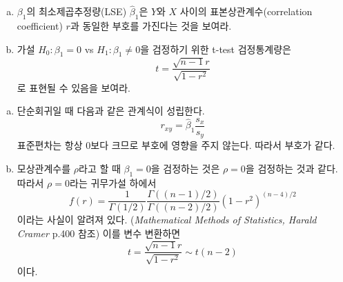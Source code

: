 \documentclass[answers]{exam}
\begin{document}
\begin{questions}
\begin{enumerate}[(a)]
    \item $\beta_{1}$의 최소제곱추정량(LSE) $\widehat{\beta}_{1}$은 $Y$와 $X$ 사이의 표본상관계수(correlation coefficient) $r$과 동일한 부호를 가진다는 것을 보여라.
    \item 가설 $H_{0}:\beta_{1}=0$ vs $H_{1}:\beta_{1}\neq 0$을 검정하기 위한 t-test 검정통계량은
    $$
      t=\dfrac{\sqrt{n-1}r}{\sqrt{1-r^{2}}}
    $$ 
    로 표현될 수 있음을 보여라.
   \end{enumerate}
   \begin{solution}
    \begin{enumerate}[(a)]
      \item 단순회귀일 때 다음과 같은 관계식이 성립한다.
      \begin{equation}
        r_{xy}=\widehat{\beta}_{1}\dfrac{s_{x}}{s_{y}}
      \end{equation}
      표준편차는 항상 0보다 크므로 부호에 영향을 주지 않는다. 따라서 부호가 같다.
      \item 모상관계수를 $\rho$라고 할 때 $\beta_{1}=0$을 검정하는 것은 $\rho=0$을 검정하는 것과 같다. 따라서 $\rho=0$라는 귀무가설 하에서
      \begin{equation}
        f\left(r\right) = \dfrac{1}{\Gamma\left(1/2\right)}\dfrac{\Gamma\left(\left(n-1\right)/2\right)}{\Gamma\left(\left(n-2\right)/2\right)}\left(1-r^{2}\right)^{\left(n-4\right)/2}
      \end{equation}
      이라는 사실이 알려져 있다. (\emph{Mathematical Methods of Statistics, Harald Cramer} p.400 참조) 이를 변수 변환하면
      \begin{equation}
        t=\dfrac{\sqrt{n-1}r}{\sqrt{1-r^{2}}}\sim t\left(n-2\right)
      \end{equation}
      이다.
    \end{enumerate}
   \end{solution}
\end{questions}
\end{document}
